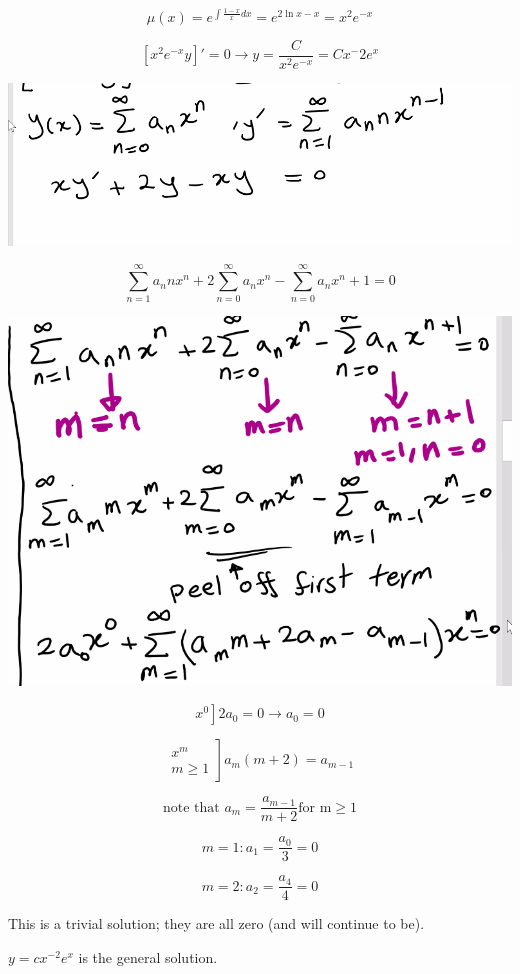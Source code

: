 \documentclass{article}
\begin{document}
$$\mu(x) = e^{\int \frac{1-x}{x} dx} = e^{2 \ln x - x} = x^2 e^{-x}$$

$$\left[x^2 e^{-x} y \right]' = 0 \rightarrow y = \frac{C}{x^2 e^{-x}} = C x^-2 e^x$$

\includegraphics[width = 0.9 \textwidth]{image3.png}

$$\sum_{n = 1}^{\infty} a_n n x^n + 2 \sum_{n = 0}^{\infty} a_n x^n - \sum_{n = 0}^{\infty} a_n x^n+1 = 0$$

\includegraphics[width = 0.9 \textwidth]{image4.png}

$$\left. x^0 \right] 2 a_0 = 0 \longrightarrow a_0 = 0$$

$$ \left. \begin{matrix} x^m \\ m \geq 1 \end{matrix} \right] a_m (m+2) = a_{m-1}$$

$$\text{note that } a_m = \frac{a_{m-1}}{m+2} \text{for m} \geq 1$$

$$m = 1: a_1 = \frac{a_0}{3} = 0$$

$$m = 2: a_2 = \frac{a_4}{4} = 0$$

This is a trivial solution; they are all zero (and will continue to be). 

$y = c x^{-2} e^x$ is the general solution. 
\end{document}
